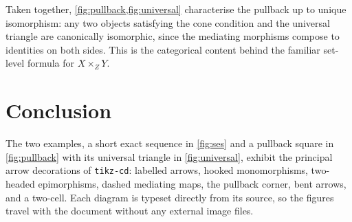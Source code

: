 \documentclass[11pt]{article}
\begin{document}
Taken together, \cref{fig:pullback,fig:universal} characterise the pullback up to
unique isomorphism: any two objects satisfying the cone condition and the
universal triangle are canonically isomorphic, since the mediating morphisms
compose to identities on both sides. This is the categorical content behind the
familiar set-level formula for $X \times_Z Y$.

\section{Conclusion}

The two examples, a short exact sequence in \cref{fig:ses} and a pullback square
in \cref{fig:pullback} with its universal triangle in \cref{fig:universal},
exhibit the principal arrow decorations of \texttt{tikz-cd}: labelled arrows,
hooked monomorphisms, two-headed epimorphisms, dashed mediating maps, the
pullback corner, bent arrows, and a two-cell. Each diagram is typeset directly
from its source, so the figures travel with the document without any external
image files.
\end{document}

